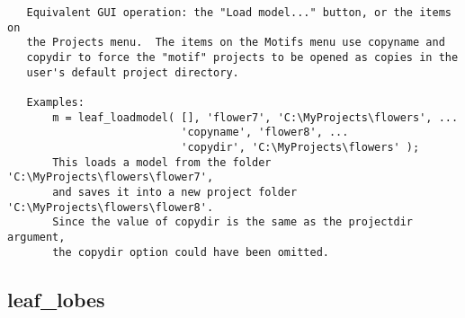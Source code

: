 \begin{verbatim}
   Equivalent GUI operation: the "Load model..." button, or the items on
   the Projects menu.  The items on the Motifs menu use copyname and
   copydir to force the "motif" projects to be opened as copies in the
   user's default project directory.

   Examples:
       m = leaf_loadmodel( [], 'flower7', 'C:\MyProjects\flowers', ...
                           'copyname', 'flower8', ...
                           'copydir', 'C:\MyProjects\flowers' );
       This loads a model from the folder 'C:\MyProjects\flowers\flower7',
       and saves it into a new project folder 'C:\MyProjects\flowers\flower8'.
       Since the value of copydir is the same as the projectdir argument,
       the copydir option could have been omitted.
\end{verbatim}

\subsection{leaf\_lobes}\label{section-leaf-lobes}

